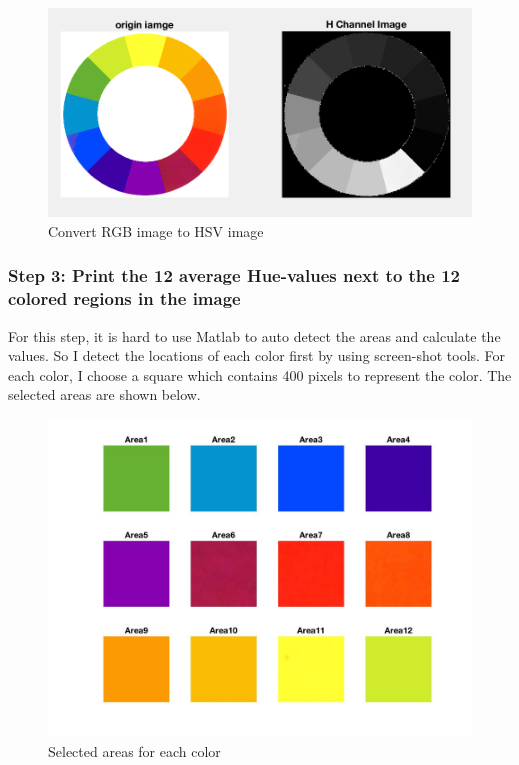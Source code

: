 \documentclass{article}
\begin{document}
\begin{figure}[htbp]
    \centering
    \includegraphics[scale = 0.6]{fig6.jpg}
    \caption{Convert RGB image to HSV image}
    \label{fig6}
\end{figure}

\subsubsection*{Step 3: Print the 12 average Hue-values next to the 12 colored regions in the image}
For this step, it is hard to use Matlab to auto detect the areas and calculate the values. So I detect the locations of each color first by using screen-shot tools. For each color, I choose a square which contains 400 pixels to represent the color. The selected areas are shown below.
\begin{figure}[htbp]
    \centering
    \includegraphics[scale = 0.2]{fig7.jpg}
    \caption{Selected areas for each color}
    \label{fig7}
\end{figure}
\end{document}
